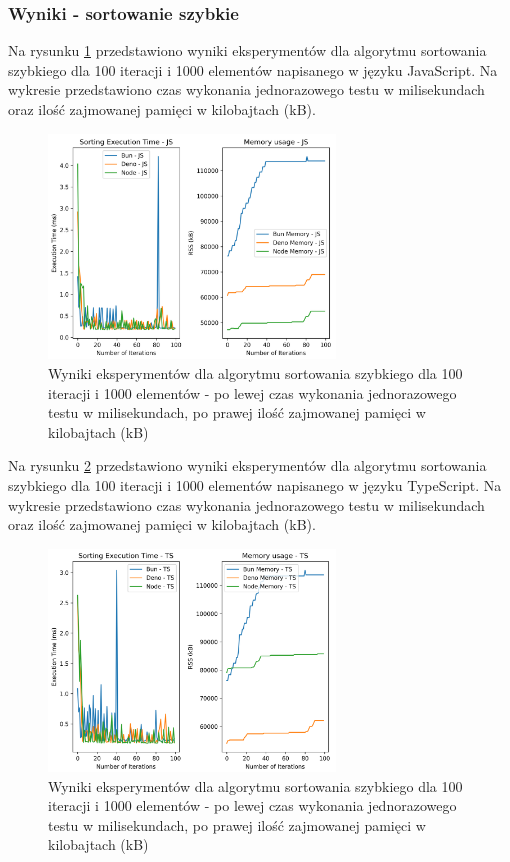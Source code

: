 \subsubsection{Wyniki - sortowanie szybkie}
Na rysunku \ref{fig:quick_sorting_e1} przedstawiono wyniki eksperymentów dla algorytmu sortowania szybkiego dla 100 iteracji i 1000 elementów napisanego w języku JavaScript. Na wykresie przedstawiono czas wykonania jednorazowego testu w milisekundach oraz ilość zajmowanej pamięci w kilobajtach (kB).

\begin{figure}[H]
  \centering
  \includegraphics[width=0.68\textwidth]{Figures/sorting/sorting_quick_100_1000_js.png}
  \caption{Wyniki eksperymentów dla algorytmu sortowania szybkiego dla 100 iteracji i 1000 elementów - po lewej czas wykonania jednorazowego testu w milisekundach, po prawej ilość zajmowanej pamięci w kilobajtach (kB)}
  \label{fig:quick_sorting_e1}
\end{figure}

Na rysunku \ref{fig:quick_sorting_e1_ts} przedstawiono wyniki eksperymentów dla algorytmu sortowania szybkiego dla 100 iteracji i 1000 elementów napisanego w języku TypeScript. Na wykresie przedstawiono czas wykonania jednorazowego testu w milisekundach oraz ilość zajmowanej pamięci w kilobajtach (kB).

\begin{figure}[H]
  \centering
  \includegraphics[width=0.68\textwidth]{Figures/sorting/sorting_quick_100_1000_ts.png}
  \caption{Wyniki eksperymentów dla algorytmu sortowania szybkiego dla 100 iteracji i 1000 elementów - po lewej czas wykonania jednorazowego testu w milisekundach, po prawej ilość zajmowanej pamięci w kilobajtach (kB)}
  \label{fig:quick_sorting_e1_ts}
\end{figure}

